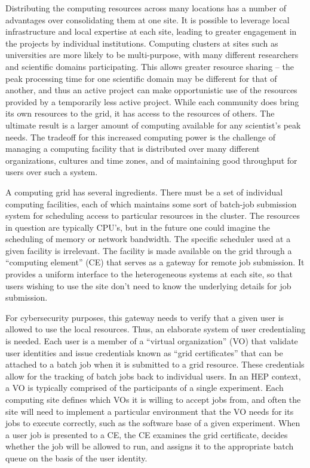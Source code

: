 Distributing the computing resources across many locations has a number of advantages over consolidating them at one site.  It is possible to leverage local infrastructure and local expertise at each site, leading to greater engagement in the projects by individual institutions.  Computing clusters at sites such as universities are more likely to be multi-purpose, with many different researchers and scientific domains participating.  This allows greater resource sharing -- the peak processing time for one scientific domain may be different for that of another, and thus an active project can make opportunistic use of the resources provided by a temporarily less active project.  While each community does bring its own resources to the grid, it has access to the resources of others.  The ultimate result is a larger amount of computing available for any scientist’s peak needs.  The tradeoff for this increased computing power is the challenge of managing a computing facility that is distributed over many different organizations, cultures and time zones, and of maintaining good throughput for users over such a system.

A computing grid has several ingredients.  There must be a set of individual computing facilities, each of which maintains some sort of batch-job submission system for scheduling access to particular resources in the cluster.  The resources in question are typically CPU’s, but in the future one could imagine the scheduling of memory or network bandwidth.  The specific scheduler used at a given facility is irrelevant.  The facility is made available on the grid through a “computing element” (CE) that serves as a gateway for remote job submission.  It provides a uniform interface to the heterogeneous systems at each site, so that users wishing to use the site don’t need to know the underlying details for job submission.

For cybersecurity purposes, this gateway needs to verify that a given user is allowed to use the local resources.  Thus, an elaborate system of user credentialing is needed.  Each user is a member of a “virtual organization” (VO) that validate user identities and issue credentials known as “grid certificates” that can be attached to a batch job when it is submitted to a grid resource.  These credentials allow for the tracking of batch jobs back to individual users.  In an HEP context, a VO is typically comprised of the participants of a single experiment.  Each computing site defines which VOs it is willing to accept jobs from, and often the site will need to implement a particular environment that the VO needs for its jobs to execute correctly, such as the software base of a given experiment.  When a user job is presented to a CE, the CE examines the grid certificate, decides whether the job will be allowed to run, and assigns it to the appropriate batch queue on the basis of the user identity.

